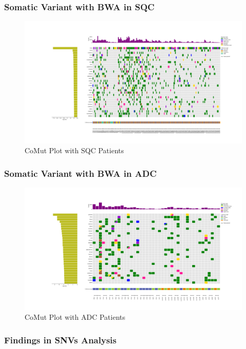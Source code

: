 \documentclass{beamer}
\begin{document}
    \begin{frame}
        \frametitle{Somatic Variant with BWA in SQC}

        \begin{figure}
            \includegraphics[width=\linewidth]{figures/Mutect2/BWA-SQC.pdf}
            \caption{CoMut Plot with SQC Patients}
        \end{figure}
    \end{frame}

    \begin{frame}
        \frametitle{Somatic Variant with BWA in ADC}

        \begin{figure}
            \includegraphics[width=\linewidth]{figures/Mutect2/BWA-ADC.pdf}
            \caption{CoMut Plot with ADC Patients}
        \end{figure}
    \end{frame}

    \begin{frame}
        \frametitle{Findings in SNVs Analysis}
    \end{frame}
\end{document}
